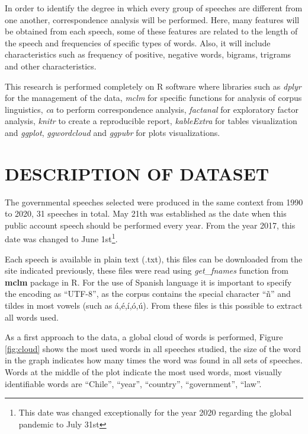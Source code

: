 \documentclass[
  12pt,
]{article}
\begin{document}
In order to identify the degree in which every group of speeches are different from one another, correspondence analysis will be performed. Here, many features will be obtained from each speech, some of these features are related to the length of the speech and frequencies of specific types of words. Also, it will include characteristics such as frequency of positive, negative words, bigrams, trigrams and other characteristics.

This research is performed completely on R software where libraries such as \emph{dplyr} for the management of the data, \emph{mclm} for specific functions for analysis of corpus linguistics, \emph{ca} to perform correspondence analysis, \emph{factanal} for exploratory factor analysis, \emph{knitr} to create a reproducible report, \emph{kableExtra} for tables visualization and \emph{ggplot}, \emph{ggwordcloud} and \emph{ggpubr} for plots visualizations.

\newpage

\hypertarget{description-of-dataset}{%
\section{DESCRIPTION OF DATASET}\label{description-of-dataset}}

The governmental speeches selected were produced in the same context from 1990 to 2020, 31 speeches in total. May 21th was established as the date when this public account speech should be performed every year. From the year 2017, this date was changed to June 1st\footnote{This date was changed exceptionally for the year 2020 regarding the global pandemic to July 31st}.

Each speech is available in plain text (.txt), this files can be downloaded from the site indicated previously, these files were read using \emph{get\_fnames} function from \textbf{mclm} package in R. For the use of Spanish language it is important to specify the encoding as ``UTF-8'', as the corpus contains the special character ``ñ'' and tildes in most vowels (such as á,é,í,ó,ú). From these files is this possible to extract all words used.

As a first approach to the data, a global cloud of words is performed, Figure \ref{fig:cloud} shows the most used words in all speeches studied, the size of the word in the graph indicates how many times the word was found in all sets of speeches. Words at the middle of the plot indicate the most used words, most visually identifiable words are ``Chile'', ``year'', ``country'', ``government'', ``law''.
\end{document}
